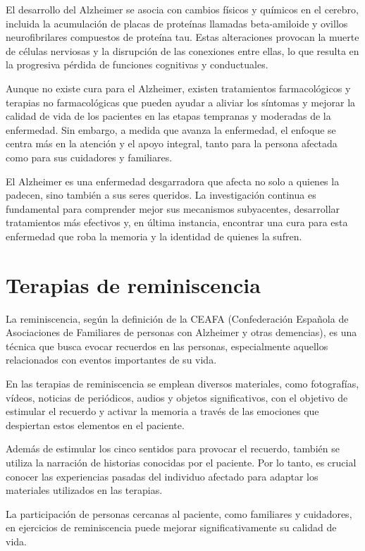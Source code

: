El desarrollo del Alzheimer se asocia con cambios físicos y químicos en el cerebro, incluida la acumulación de placas de proteínas llamadas beta-amiloide y ovillos neurofibrilares compuestos de proteína tau. Estas alteraciones provocan la muerte de células nerviosas y la disrupción de las conexiones entre ellas, lo que resulta en la progresiva pérdida de funciones cognitivas y conductuales.

Aunque no existe cura para el Alzheimer, existen tratamientos farmacológicos y terapias no farmacológicas que pueden ayudar a aliviar los síntomas y mejorar la calidad de vida de los pacientes en las etapas tempranas y moderadas de la enfermedad. Sin embargo, a medida que avanza la enfermedad, el enfoque se centra más en la atención y el apoyo integral, tanto para la persona afectada como para sus cuidadores y familiares.

El Alzheimer es una enfermedad desgarradora que afecta no solo a quienes la padecen, sino también a sus seres queridos. La investigación continua es fundamental para comprender mejor sus mecanismos subyacentes, desarrollar tratamientos más efectivos y, en última instancia, encontrar una cura para esta enfermedad que roba la memoria y la identidad de quienes la sufren.
\section{Terapias de reminiscencia}
La reminiscencia, según la definición de la CEAFA (Confederación Española de Asociaciones de Familiares de personas con Alzheimer y otras demencias), es una técnica que busca evocar recuerdos en las personas, especialmente aquellos relacionados con eventos importantes de su vida.

En las terapias de reminiscencia se emplean diversos materiales, como fotografías, vídeos, noticias de periódicos, audios y objetos significativos, con el objetivo de estimular el recuerdo y activar la memoria a través de las emociones que despiertan estos elementos en el paciente.

Además de estimular los cinco sentidos para provocar el recuerdo, también se utiliza la narración de historias conocidas por el paciente. Por lo tanto, es crucial conocer las experiencias pasadas del individuo afectado para adaptar los materiales utilizados en las terapias.

La participación de personas cercanas al paciente, como familiares y cuidadores, en ejercicios de reminiscencia puede mejorar significativamente su calidad de vida.

